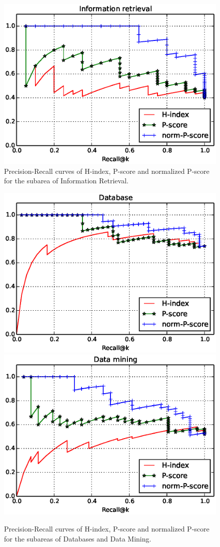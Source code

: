 \documentclass[msc]{ppgccufmg}
\begin{document}
\begin{figure}[htbp]
    \centering
    \includegraphics[width=0.8\linewidth]{fig/ir-prec-recall.eps}
    \caption{Precision-Recall curves of H-index, P-score and normalized P-score for the subarea of Information Retrieval.}
    \label{fig:norm-pscore-curves-ir}
\end{figure}

\begin{figure}[htbp]
    \centering
    \includegraphics[width=0.8\linewidth]{fig/db-prec-recall.eps}
    \includegraphics[width=0.8\linewidth]{fig/dm-prec-recall.eps}
    \caption{Precision-Recall curves of H-index, P-score and normalized P-score for the subareas of Databases and Data Mining.}
    \label{fig:norm-pscore-curves-db-dm}
\end{figure}
\end{document}

